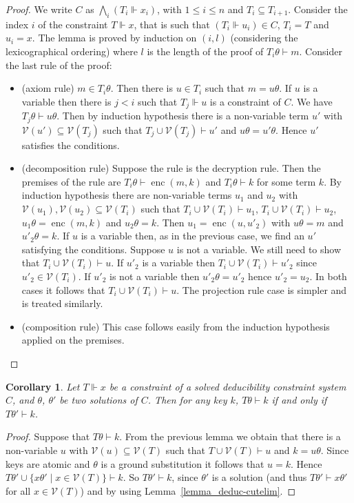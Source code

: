 \documentclass[acmtocl,acmnow]{acmtrans2m}
\newtheorem{corollary}[theorem]{Corollary}
\newcommand{\var}{\mathcal{V}}
\newcommand{\set}[1]{\lbrace{#1}\rbrace}
\newcommand{\penc}[2]{\operatorname{enc}(#1,#2)}
\newcommand{\dedsys}[1]{deducibility constraint system}
\begin{document}
\begin{proof}
We write $C$ as $\bigwedge_i(T_i\Vdash x_i)$, with $1\le i\le n$ and $T_i\subseteq T_{i+1}$.
Consider the index $i$ of the constraint $T\Vdash x$, that is such that $(T_i\Vdash u_i)\in C$, $T_i=T$ and $u_i=x$. The lemma is proved by induction on $(i,l)$ (considering the lexicographical ordering)
where $l$ is the length of the proof of $T_i\theta\vdash m$. Consider the last rule of the proof:
\begin{itemize}
 \item (axiom rule) $m\in T_i\theta$. Then there is $u\in T_i$ such that $m=u\theta$. If $u$ is a variable
then there is $j<i$ such that $T_j\Vdash u$ is a constraint of $C$. We have $T_j\theta\vdash u\theta$. Then
by induction hypothesis there is a non-variable term $u'$ with $\var(u')\subseteq\var(T_j)$ such that
$T_j\cup\var(T_j)\vdash u'$ and $u\theta=u'\theta$. Hence $u'$ satisfies the conditions.

 \item (decomposition rule) Suppose the rule is the decryption rule. Then the premises of the rule are
$T_i\theta\vdash \penc{m}{k}$ and $T_i\theta\vdash k$ for some term $k$. By induction hypothesis
there are non-variable terms $u_1$ and $u_2$ with $\var(u_1),\var(u_2)\subseteq\var(T_i)$ such that
$T_i\cup{\var(T_i)}\vdash u_1$, $T_i\cup{\var(T_i)}\vdash u_2$, $u_1\theta=\penc{m}{k}$ and
$u_2\theta=k$. Then $u_1=\penc{u}{u'_2}$ with $u\theta=m$ and $u'_2\theta=k$. If $u$ is a variable then, as in
the previous case, we find an $u'$ satisfying the conditions. Suppose $u$ is not a variable. We still need to
show that $T_i\cup{\var(T_i)}\vdash u$. If $u'_2$ is a variable then
$T_i\cup{\var(T_i)}\vdash u'_2$ since $u'_2\in\var(T_i)$. If $u'_2$ is not a variable then $u'_2\theta=u'_2$
hence $u'_2=u_2$. In both cases it follows that $T_i\cup{\var(T_i)}\vdash u$. The projection rule case is
simpler and is treated similarly.

\item (composition rule) This case follows easily from the induction hypothesis applied on the premises.
\end{itemize}
\end{proof}



\begin{corollary}\label{cor:same_keys}
Let $T\Vdash x$ be a constraint of a solved \dedsys{} $C$, and $\theta$, $\theta'$ be two 
solutions of $C$. Then for any key $k$, $T\theta\vdash k$ if and only if $T\theta'\vdash k$.
\end{corollary}
\begin{proof}
Suppose that $T\theta\vdash k$. From the previous lemma we obtain that there is a non-variable $u$ with
$\var(u)\subseteq\var(T)$ such that $T\cup{\var(T)}\vdash u$ and $k=u\theta$.
Since keys are atomic and $\theta$ is a ground substitution it follows that $u=k$. Hence
$T\theta'\cup\set{x\theta'\mid x\in\var(T)}\vdash k$. So $T\theta'\vdash k$, since $\theta'$ is a  solution (and thus $T\theta'\vdash x\theta'$ for all $x\in\var(T)$) and by using Lemma~\ref{lemma_deduc-cutelim}.
\end{proof}
\end{document}
